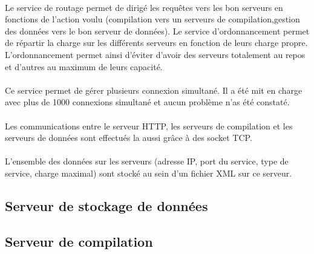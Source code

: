 \documentclass[a4paper,12pt]{article}
\begin{document}
\paragraph*{}
Le service de routage permet de dirigé les requêtes vers les bon serveurs en fonctions de l'action voulu (compilation vers un serveurs de compilation,gestion des données vers le bon serveur de données). Le service d'ordonnancement permet de répartir la charge sur les différents serveurs en fonction de leurs charge propre. L'ordonnancement permet ainsi d'éviter d'avoir des serveurs totalement au repos et d'autres au maximum de leurs capacité.

\paragraph*{}
Ce service permet de gérer plusieurs connexion simultané. Il a été mit en charge avec plus de 1000 connexions simultané et aucun problème n'as été constaté.

\paragraph*{}
Les communications entre le serveur HTTP, les serveurs de compilation et les serveurs de données sont effectués la aussi grâce à des socket TCP.

\paragraph*{}
L'ensemble des données sur les serveurs (adresse IP, port du service, type de service, charge maximal) sont stocké au sein d'un fichier XML sur ce serveur.


\subsection{Serveur de stockage de données}
\paragraph*{}

\subsection{Serveur de compilation}
\end{document}

